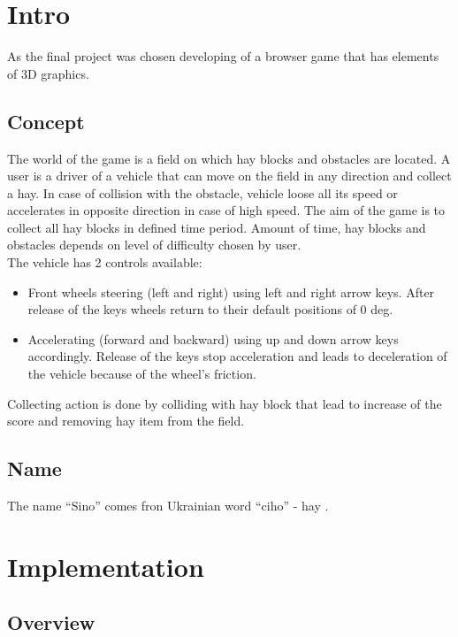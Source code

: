 \documentclass[12pt]{article}
\begin{document}

\tableofcontents
\pagebreak

\section{Intro}
As the final project was chosen developing of a browser game that has elements of 3D graphics. 
\subsection{Concept}
The world of the game is a field on which hay blocks and obstacles are located. A user is a driver of a vehicle that can move on the field in any direction and collect a hay. In case of collision with the obstacle, vehicle loose all its speed or accelerates in opposite direction in case of high speed. The aim of the game is to collect all hay blocks in defined time period.  Amount of time, hay blocks and obstacles depends on level of difficulty chosen by user. 
\\
The vehicle has 2 controls available:
\begin{itemize}
\item {
Front wheels steering (left and right) using left and right arrow keys. After release of the keys wheels return to their default positions of 0 deg.
}
\item {
Accelerating (forward and backward) using up and down arrow keys accordingly. Release of the keys stop acceleration and leads to deceleration of the vehicle because of the wheel's friction.
}
\end{itemize}
Collecting action is done by colliding with hay block that lead to increase of the score and removing hay item from the field.
\subsection{Name}
The name ``Sino'' comes fron Ukrainian word ``ciho'' - hay \cite{wiki:sino}.


\newpage
\section{Implementation}
\subsection{Overview}
\end{document}
